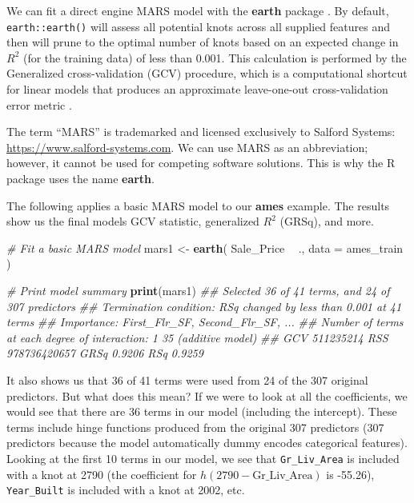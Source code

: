 \documentclass[]{krantz}
\makeatletter
\newenvironment{Shaded}{\begin{snugshade}}{\end{snugshade}}
\newcommand{\CommentTok}[1]{\textcolor[rgb]{0.37,0.37,0.37}{\textit{#1}}}
\newcommand{\DataTypeTok}[1]{\textcolor[rgb]{0.27,0.27,0.27}{#1}}
\newcommand{\KeywordTok}[1]{\textcolor[rgb]{0.27,0.27,0.27}{\textbf{#1}}}
\newcommand{\NormalTok}[1]{#1}
\newcommand{\OperatorTok}[1]{\textcolor[rgb]{0.43,0.43,0.43}{\textbf{#1}}}
\newcommand{\StringTok}[1]{\textcolor[rgb]{0.5,0.5,0.5}{#1}}
\newenvironment{kframe}{%
\medskip{}
\setlength{\fboxsep}{.8em}
 \def\at@end@of@kframe{}%
 \ifinner\ifhmode%
  \def\at@end@of@kframe{\end{minipage}}%
  \begin{minipage}{\columnwidth}%
 \fi\fi%
 \def\FrameCommand##1{\hskip\@totalleftmargin \hskip-\fboxsep
 \colorbox{shadecolor}{##1}\hskip-\fboxsep
     \hskip-\linewidth \hskip-\@totalleftmargin \hskip\columnwidth}%
 \MakeFramed {\advance\hsize-\width
   \@totalleftmargin\z@ \linewidth\hsize
   \@setminipage}}%
 {\par\unskip\endMakeFramed%
 \at@end@of@kframe}
\newenvironment{block}[1]
  {
  \begin{itemize}
  \renewcommand{\labelitemi}{
    \raisebox{-.7\height}[0pt][0pt]{
      {\setkeys{Gin}{width=3em,keepaspectratio}\texttt{[image: icons/\#1]}}
    }
  }
  \setlength{\fboxsep}{1em}
  \begin{kframe}
  \item
  }
  {
  \end{kframe}
  \end{itemize}
  }
\newenvironment{note}
  {\begin{block}{note}}
  {\end{block}}
\renewenvironment{Shaded}{\begin{kframe}}{\end{kframe}}
\makeatother
\begin{document}
We can fit a direct engine MARS model with the \textbf{earth} package \citep{R-earth}. By default, \texttt{earth::earth()} will assess all potential knots across all supplied features and then will prune to the optimal number of knots based on an expected change in \(R^2\) (for the training data) of less than 0.001. This calculation is performed by the Generalized cross-validation (GCV) procedure, which is a computational shortcut for linear models that produces an approximate leave-one-out cross-validation error metric \citep{golub1979generalized}.

\begin{note}
The term ``MARS'' is trademarked and licensed exclusively to Salford
Systems: \url{https://www.salford-systems.com}. We can use MARS as an
abbreviation; however, it cannot be used for competing software
solutions. This is why the R package uses the name \textbf{earth}.
\end{note}

The following applies a basic MARS model to our \textbf{ames} example. The results show us the final models GCV statistic, generalized \(R^2\) (GRSq), and more.

\begin{Shaded}
\begin{Highlighting}[]
\CommentTok{# Fit a basic MARS model}
\NormalTok{mars1 <-}\StringTok{ }\KeywordTok{earth}\NormalTok{(}
\NormalTok{  Sale_Price }\OperatorTok{~}\StringTok{ }\NormalTok{.,  }
  \DataTypeTok{data =}\NormalTok{ ames_train   }
\NormalTok{)}

\CommentTok{# Print model summary}
\KeywordTok{print}\NormalTok{(mars1)}
\CommentTok{## Selected 36 of 41 terms, and 24 of 307 predictors}
\CommentTok{## Termination condition: RSq changed by less than 0.001 at 41 terms}
\CommentTok{## Importance: First_Flr_SF, Second_Flr_SF, ...}
\CommentTok{## Number of terms at each degree of interaction: 1 35 (additive model)}
\CommentTok{## GCV 511235214    RSS 978736420657    GRSq 0.9206    RSq 0.9259}
\end{Highlighting}
\end{Shaded}

It also shows us that 36 of 41 terms were used from 24 of the 307 original predictors. But what does this mean? If we were to look at all the coefficients, we would see that there are 36 terms in our model (including the intercept). These terms include hinge functions produced from the original 307 predictors (307 predictors because the model automatically dummy encodes categorical features). Looking at the first 10 terms in our model, we see that \texttt{Gr\_Liv\_Area} is included with a knot at 2790 (the coefficient for \(h\left(2790-\text{Gr\_Liv\_Area}\right)\) is -55.26), \texttt{Year\_Built} is included with a knot at 2002, etc.
\end{document}
